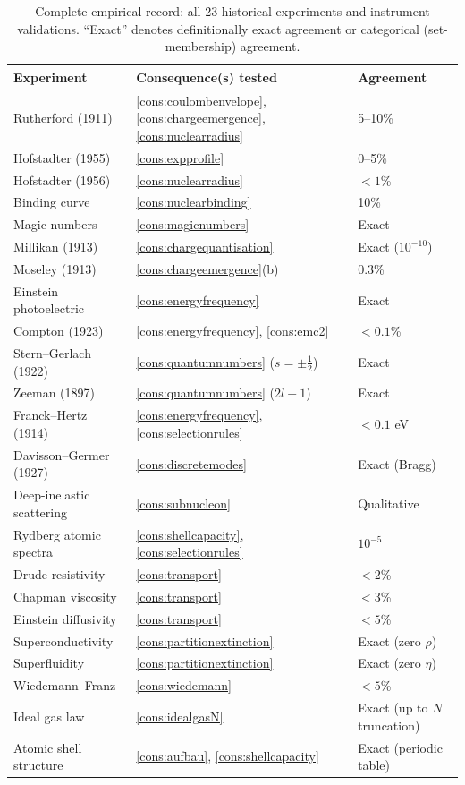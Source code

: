 \begin{table}[htbp]
\centering
\caption{Complete empirical record: all 23 historical experiments and
instrument validations.  ``Exact'' denotes definitionally exact agreement
or categorical (set-membership) agreement.}
\label{tab:empirical-record}
\begin{tabular}{@{}lll@{}}
\toprule
Experiment & Consequence(s) tested & Agreement \\
\midrule
Rutherford (1911) & \ref{cons:coulombenvelope}, \ref{cons:chargeemergence},
  \ref{cons:nuclearradius} & 5--10\% \\
Hofstadter (1955) & \ref{cons:expprofile} & 0--5\% \\
Hofstadter (1956) & \ref{cons:nuclearradius} & $<1$\% \\
Binding curve & \ref{cons:nuclearbinding} & 10\% \\
Magic numbers & \ref{cons:magicnumbers} & Exact \\
Millikan (1913) & \ref{cons:chargequantisation} & Exact ($10^{-10}$) \\
Moseley (1913) & \ref{cons:chargeemergence}(b) & 0.3\% \\
Einstein photoelectric & \ref{cons:energyfrequency} & Exact \\
Compton (1923) & \ref{cons:energyfrequency}, \ref{cons:emc2} & $<0.1$\% \\
Stern--Gerlach (1922) & \ref{cons:quantumnumbers} ($s=\pm\tfrac12$) & Exact \\
Zeeman (1897) & \ref{cons:quantumnumbers} ($2l+1$) & Exact \\
Franck--Hertz (1914) & \ref{cons:energyfrequency}, \ref{cons:selectionrules} &
  $<0.1$ eV \\
Davisson--Germer (1927) & \ref{cons:discretemodes} & Exact (Bragg) \\
Deep-inelastic scattering & \ref{cons:subnucleon} & Qualitative \\
Rydberg atomic spectra & \ref{cons:shellcapacity}, \ref{cons:selectionrules} &
  $10^{-5}$ \\
Drude resistivity & \ref{cons:transport} & $<2$\% \\
Chapman viscosity & \ref{cons:transport} & $<3$\% \\
Einstein diffusivity & \ref{cons:transport} & $<5$\% \\
Superconductivity & \ref{cons:partitionextinction} & Exact (zero $\rho$) \\
Superfluidity & \ref{cons:partitionextinction} & Exact (zero $\eta$) \\
Wiedemann--Franz & \ref{cons:wiedemann} & $<5$\% \\
Ideal gas law & \ref{cons:idealgasN} & Exact (up to $N$ truncation) \\
Atomic shell structure & \ref{cons:aufbau}, \ref{cons:shellcapacity} &
  Exact (periodic table) \\
\bottomrule
\end{tabular}
\end{table}

